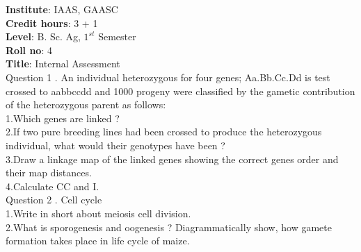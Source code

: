 \documentclass[12pt]{article}\usepackage[]{graphicx}\usepackage[]{color}
\begin{document}
{            \textbf{Institute}: IAAS, GAASC \\}\textbf{Credit hours}: 3 + 1 \\\textbf{Level}: B. Sc. Ag, $1^{st}$ Semester \\\textbf{Roll no}: 4 \\\textbf{Title}: Internal Assessment \\[1cm]Question 1 . An individual heterozygous for four genes; Aa.Bb.Cc.Dd is test crossed to aabbccdd and 1000 progeny were classified by the gametic contribution of the heterozygous parent as follows: \\\hspace{0.5cm}1.Which genes are linked ?\\\hspace{0.5cm}2.If two pure breeding lines had been crossed to produce the heterozygous individual, what would their genotypes have been ?\\\hspace{0.5cm}3.Draw a linkage map of the linked genes showing the correct genes order and their map distances.\\\hspace{0.5cm}4.Calculate CC and I.\\Question 2 . Cell cycle \\\hspace{0.5cm}1.Write in short about meiosis cell division.\\\hspace{0.5cm}2.What is sporogenesis and oogenesis ? Diagrammatically show, how gamete formation takes place in life cycle of maize.\\
\end{document}
